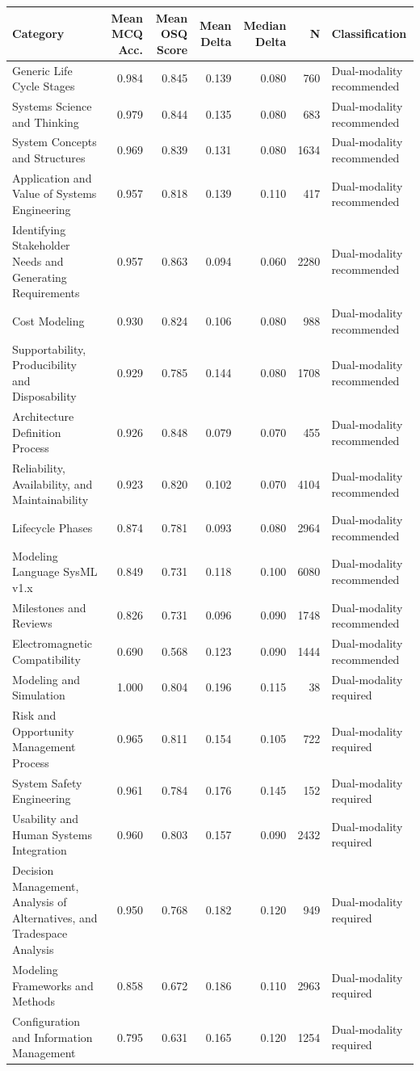 \begin{tabular}{lrrrrrl}
\toprule
Category & Mean MCQ Acc. & Mean OSQ Score & Mean Delta & Median Delta & N & Classification \\
\midrule
Generic Life Cycle Stages & 0.984 & 0.845 & 0.139 & 0.080 & 760 & Dual-modality recommended \\
Systems Science and Thinking & 0.979 & 0.844 & 0.135 & 0.080 & 683 & Dual-modality recommended \\
System Concepts and Structures & 0.969 & 0.839 & 0.131 & 0.080 & 1634 & Dual-modality recommended \\
Application and Value of Systems Engineering & 0.957 & 0.818 & 0.139 & 0.110 & 417 & Dual-modality recommended \\
Identifying Stakeholder Needs and Generating Requirements & 0.957 & 0.863 & 0.094 & 0.060 & 2280 & Dual-modality recommended \\
Cost Modeling & 0.930 & 0.824 & 0.106 & 0.080 & 988 & Dual-modality recommended \\
Supportability, Producibility and Disposability & 0.929 & 0.785 & 0.144 & 0.080 & 1708 & Dual-modality recommended \\
Architecture Definition Process & 0.926 & 0.848 & 0.079 & 0.070 & 455 & Dual-modality recommended \\
Reliability, Availability, and Maintainability & 0.923 & 0.820 & 0.102 & 0.070 & 4104 & Dual-modality recommended \\
Lifecycle Phases & 0.874 & 0.781 & 0.093 & 0.080 & 2964 & Dual-modality recommended \\
Modeling Language SysML v1.x & 0.849 & 0.731 & 0.118 & 0.100 & 6080 & Dual-modality recommended \\
Milestones and Reviews & 0.826 & 0.731 & 0.096 & 0.090 & 1748 & Dual-modality recommended \\
Electromagnetic Compatibility & 0.690 & 0.568 & 0.123 & 0.090 & 1444 & Dual-modality recommended \\
Modeling and Simulation & 1.000 & 0.804 & 0.196 & 0.115 & 38 & Dual-modality required \\
Risk and Opportunity Management Process & 0.965 & 0.811 & 0.154 & 0.105 & 722 & Dual-modality required \\
System Safety Engineering & 0.961 & 0.784 & 0.176 & 0.145 & 152 & Dual-modality required \\
Usability and Human Systems Integration & 0.960 & 0.803 & 0.157 & 0.090 & 2432 & Dual-modality required \\
Decision Management, Analysis of Alternatives, and Tradespace Analysis & 0.950 & 0.768 & 0.182 & 0.120 & 949 & Dual-modality required \\
Modeling Frameworks and Methods & 0.858 & 0.672 & 0.186 & 0.110 & 2963 & Dual-modality required \\
Configuration and Information Management & 0.795 & 0.631 & 0.165 & 0.120 & 1254 & Dual-modality required \\
\bottomrule
\end{tabular}
